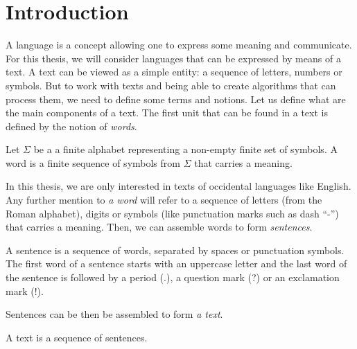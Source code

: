 \fancyhead[LE]{\textbf{\thepage}~~~\textit{\leftmark}}
\fancyhead[RE]{\MakeUppercase{\chaptername}~\thechapter}
\fancyhead[LO]{\textit{\rightmark}}
\fancyhead[RO]{\textbf{\thepage}}

\section{Introduction}
  \label{ch01:sec:introduction}
  A language is a concept allowing one to express some meaning and communicate.
  For this thesis, we will consider languages that can be expressed by means
  of a text. A text can be viewed as a simple entity: a sequence of letters,
  numbers or symbols. But to work with texts and being able to create algorithms
  that can process them, we need to define some terms and notions. Let us define
  what are the main components of a text. The first unit that can be found in a
  text is defined by the notion of \textit{words}.

  \theoremstyle{definition}
  \begin{definition}[A word]
    \label{ch01:def:def-word}
    Let $\Sigma$ be a a finite alphabet representing a non-empty finite set of
    symbols. A word is a finite sequence of symbols from $\Sigma$ that carries a
    meaning.
  \end{definition}

  In this thesis, we are only interested in texts of occidental languages like
  English. Any further mention to \textit{a word} will refer to a sequence of
  letters (from the Roman alphabet), digits or symbols (like punctuation marks
  such as dash ``-'') that carries a meaning. Then, we can assemble words to
  form \textit{sentences}.

  \theoremstyle{definition}
  \begin{definition}[A sentence]
    \label{ch01:def:def-sentence}
    A sentence is a sequence of words, separated by spaces or punctuation
    symbols.  The first word of a sentence starts with an uppercase letter and
    the last word of the sentence is followed by a period (.), a question mark
    (?) or an exclamation mark (!).
  \end{definition}

  Sentences can be then be assembled to form \textit{a text}.

  \theoremstyle{definition}
  \begin{definition}[A text]
    \label{ch01:def:def-text}
    A text is a sequence of sentences.
  \end{definition}

